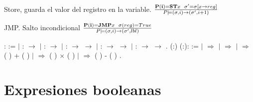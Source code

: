 \documentclass[12pt]{report}
\begin{document}
Store, guarda el valor del registro en la variable. $\frac{ {\bf P(i)=ST}  x \>\>\> \sigma'=\sigma[x \rightarrow reg]}{P \models (\sigma,i) \rightarrow (\sigma',i+1)}$


JMP. Salto incondicional  $\frac{ {\bf P(i)=JMP}  x \>\>\> \sigma(reg)=True}{P \models (\sigma,i) \rightarrow (\sigma',lbl)}$


\begin{coqdoccode}
\coqdocemptyline
\coqdocnoindent
{}  :  :=\coqdoceol
\coqdocnoindent
\ensuremath{|}  :  \ensuremath{\rightarrow} \coqdoceol
\coqdocnoindent
\ensuremath{|}  :  \ensuremath{\rightarrow} \coqdoceol
\coqdocnoindent
\ensuremath{|}  :  \ensuremath{\rightarrow}  \ensuremath{\rightarrow} \coqdoceol
\coqdocnoindent
\ensuremath{|}  :  \ensuremath{\rightarrow}  \ensuremath{\rightarrow} \coqdoceol
\coqdocnoindent
\ensuremath{|}  :  \ensuremath{\rightarrow}  \ensuremath{\rightarrow} .\coqdoceol
\coqdocemptyline
\coqdocnoindent
{}  (:) (:): :=\coqdoceol
\coqdocnoindent
{}  \coqdoceol
\coqdocnoindent
\ensuremath{|}   \ensuremath{\Rightarrow}   \coqdoceol
\coqdocnoindent
\ensuremath{|}   \ensuremath{\Rightarrow}  \coqdoceol
\coqdocnoindent
\ensuremath{|}    \ensuremath{\Rightarrow} (  ) + (  )\coqdoceol
\coqdocnoindent
\ensuremath{|}    \ensuremath{\Rightarrow} (  ) \ensuremath{\times} (  )\coqdoceol
\coqdocnoindent
\ensuremath{|}    \ensuremath{\Rightarrow} (  ) - (  )\coqdoceol
\coqdocnoindent
{}.\coqdoceol
\coqdocemptyline
\end{coqdoccode}
\section{Expresiones booleanas}
\end{document}
